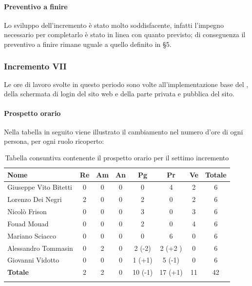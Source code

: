 			\paragraph{Preventivo a finire}
				Lo sviluppo dell'incremento è stato molto soddisfacente, infatti l'impegno necessario per completarlo è stato in linea con quanto previsto; di conseguenza il preventivo a finire rimane uguale a quello definito in \S5.
		\pagebreak
		
		\subsubsection{Incremento VII}
			Le ore di lavoro svolte in questo periodo sono volte all'implementazione base del , della schermata di login del sito web e della parte privata e pubblica del sito.
			\paragraph{Prospetto orario}
			Nella tabella in seguito viene illustrato il cambiamento nel numero d'ore di ogni persona, per ogni ruolo ricoperto:
		
			\begin{longtable}{|l|c|c|c|c|c|c|c|}
				\hline
				\rowcolor{lighter-grayer}
				\textbf{Nome} & \textbf{Re} & \textbf{Am} & \textbf{An} & \textbf{Pg}  & \textbf{Pr}   & \textbf{Ve} & \textbf{Totale} \\
				\hline
				\endfirsthead
				
				\hline
				Giuseppe Vito Bitetti 		 & 0 & 0 & 0 & 0 & 4 & 2 & 6\\
				\hline
				\hline
				Lorenzo Dei Negri			 & 2 & 0 & 0 & 2 & 0 & 2 & 6\\
				\hline
				\hline
				Nicolò Frison				      & 0 & 0 & 0 & 3 & 0 & 3 & 6\\
				\hline
				\hline
				Fouad Mouad 				   & 0 & 0 & 0 & 2 & 0 & 4 & 6\\
				\hline
				\hline
				Mariano Sciacco 			 & 0 & 0 & 0 & 0 & 6 & 0 & 6\\
				\hline
				\hline
				Alessandro Tommasin    & 0 & 2 & 0 & 2 (-2) & 2 (+2 )& 0 & 6\\
				\hline
				\hline
				Giovanni Vidotto 			  & 0 & 0 & 0 & 1 (+1) & 5 (-1) & 0 & 6\\
				\hline 
				\textbf{Totale}			 		& 2 & 2 & 0 & 10 (-1) & 17 (+1) & 11 & 42\\
				\hline
				\caption{Tabella consuntiva contenente il prospetto orario per il settimo incremento}
			\end{longtable}
		
